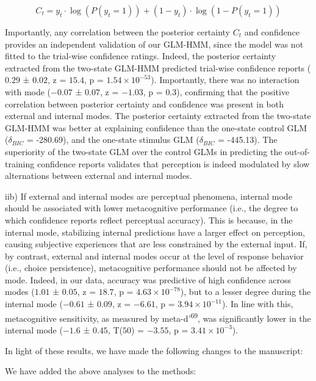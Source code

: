 \documentclass[
]{article}
\begin{document}
\[
C_t = y_t \cdot \log(P(y_t = 1)) + (1 - y_t) \cdot \log(1 - P(y_t = 1)) 
\]

Importantly, any correlation between the posterior certainty \(C_t\) and
confidence provides an independent validation of our GLM-HMM, since the
model was not fitted to the trial-wise confidence ratings. Indeed, the
posterior certainty extracted from the two-state GLM-HMM predicted
trial-wise confidence reports (\(0.29\) ± \(0.02\), z = \(15.4\), p =
\(\ensuremath{1.54\times 10^{-53}}\)). Importantly, there was no
interaction with mode (\(-0.07\) ± \(0.07\), z = \(-1.03\), p =
\(0.3\)), confirming that the positive correlation between posterior
certainty and confidence was present in both external and internal
modes. The posterior certainty extracted from the two-state GLM-HMM was
better at explaining confidence than the one-state control GLM
(\(\delta_{BIC}\) = -280.69), and the one-state stimulus GLM
(\(\delta_{BIC}\) = -445.13). The superiority of the two-state GLM over
the control GLMs in predicting the out-of-training confidence reports
validates that perception is indeed modulated by slow alternations
between external and internal modes.

iib) If external and internal modes are perceptual phenomena, internal
mode should be associated with lower metacognitive performance (i.e.,
the degree to which confidence reports reflect perceptual accuracy).
This is because, in the internal mode, stabilizing internal predictions
have a larger effect on perception, causing subjective experiences that
are less constrained by the external input. If, by contrast, external
and internal modes occur at the level of response behavior (i.e., choice
persistence), metacognitive performance should not be affected by mode.
Indeed, in our data, accuracy was predictive of high confidence across
modes (\(1.01\) ± \(0.05\), z = \(18.7\), p =
\(\ensuremath{4.63\times 10^{-78}}\)), but to a lesser degree during the
internal mode (\(-0.61\) ± \(0.09\), z = \(-6.61\), p =
\(\ensuremath{3.94\times 10^{-11}}\)). In line with this, metacognitive
sensitivity, as measured by meta-d'\textsuperscript{69}, was
significantly lower in the internal mode (\(-1.6\) ± \(0.45\), T(\(50\))
= \(-3.55\), p = \(\ensuremath{3.41\times 10^{-3}}\)).

In light of these results, we have made the following changes to the
manuscript:

We have added the above analyses to the methods:
\end{document}
